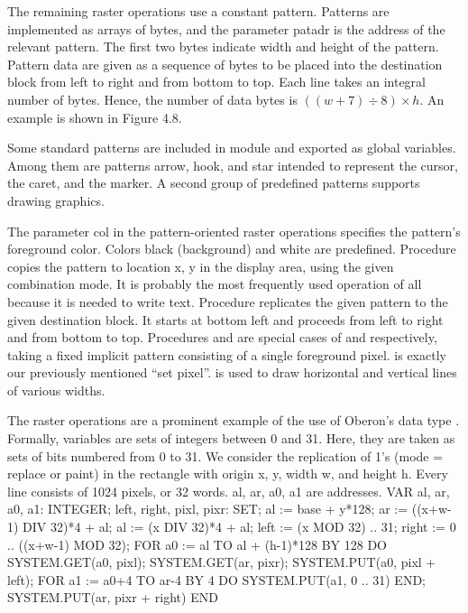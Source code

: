 The remaining raster operations use a constant pattern. Patterns are
implemented as arrays of bytes, and the parameter patadr is the
address of the relevant pattern. The first two bytes indicate width 
and height  of the pattern. Pattern data are given as a sequence of
bytes to be placed into the destination block from left to right and
from bottom to top. Each line takes an integral number of
bytes. Hence, the number of data bytes is $((w+7) \div 8) \times h$. An
example is shown in Figure 4.8.


Some standard patterns are included in module  and exported as
global variables. Among them are patterns arrow, hook, and star
intended to represent the cursor, the caret, and the marker. A second
group of predefined patterns supports drawing graphics.

The parameter col in the pattern-oriented raster operations specifies
the pattern's foreground color. Colors black (background) and white
are predefined. Procedure  copies the pattern to location
x, y in the display area, using the given combination mode. It is
probably the most frequently used operation of all because it is
needed to write text. Procedure  replicates the given
pattern to the given destination block. It starts at bottom left and
proceeds from left to right and from bottom to top. Procedures  and
 are special cases of  and 
respectively, taking a fixed implicit pattern consisting of a single
foreground pixel.  is exactly our previously mentioned ``set pixel''.
 is used to draw horizontal and vertical lines of
various widths.

The raster operations are a prominent example of the use of Oberon's
data type . Formally, variables are sets of integers between 0 and
31. Here, they are taken as sets of bits numbered from 0 to 31. We
consider the replication of 1's (mode = replace or paint) in the
rectangle with origin x, y, width w, and height h. Every line consists
of 1024 pixels, or 32 words. al, ar, a0, a1 are addresses.
\begintt
VAR al, ar, a0, a1: INTEGER;
    left, right, pixl, pixr: SET;
al := base + y*128;
ar := ((x+w-1) DIV 32)*4 + al; al := (x DIV 32)*4 + al;
left := {(x MOD 32) .. 31}; right := {0 .. ((x+w-1) MOD 32)};
FOR a0 := al TO al + (h-1)*128 BY 128 DO
  SYSTEM.GET(a0, pixl); SYSTEM.GET(ar, pixr);
  SYSTEM.PUT(a0, pixl + left);
  FOR a1 := a0+4 TO ar-4 BY 4 DO SYSTEM.PUT(a1, {0 .. 31}) END;
  SYSTEM.PUT(ar, pixr + right)
END
\endtt

